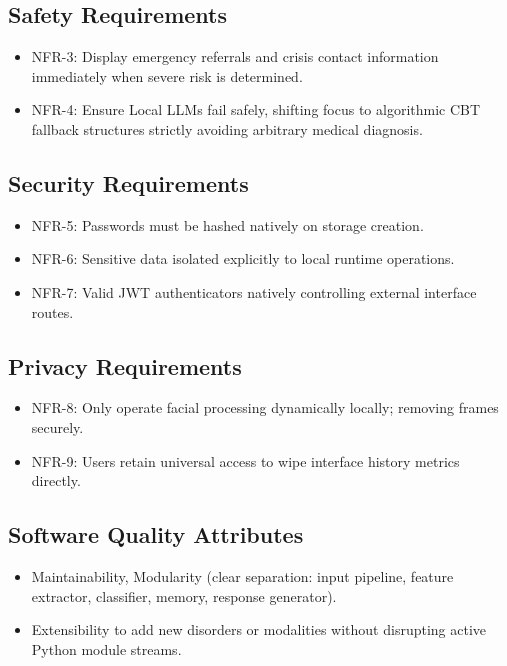 \documentclass[11pt]{report}
\begin{document}
\subsection{Safety Requirements}
\begin{itemize}
    \item NFR-3: Display emergency referrals and crisis contact information immediately when severe risk is determined.
    \item NFR-4: Ensure Local LLMs fail safely, shifting focus to algorithmic CBT fallback structures strictly avoiding arbitrary medical diagnosis.
\end{itemize}

\subsection{Security Requirements}
\begin{itemize}
    \item NFR-5: Passwords must be hashed natively on storage creation.
    \item NFR-6: Sensitive data isolated explicitly to local runtime operations.
    \item NFR-7: Valid JWT authenticators natively controlling external interface routes.
\end{itemize}

\subsection{Privacy Requirements}
\begin{itemize}
    \item NFR-8: Only operate facial processing dynamically locally; removing frames securely.
    \item NFR-9: Users retain universal access to wipe interface history metrics directly.
\end{itemize}

\subsection{Software Quality Attributes}
\begin{itemize}
    \item Maintainability, Modularity (clear separation: input pipeline, feature extractor, classifier, memory, response generator).
    \item Extensibility to add new disorders or modalities without disrupting active Python module streams.
\end{itemize}
\end{document}
